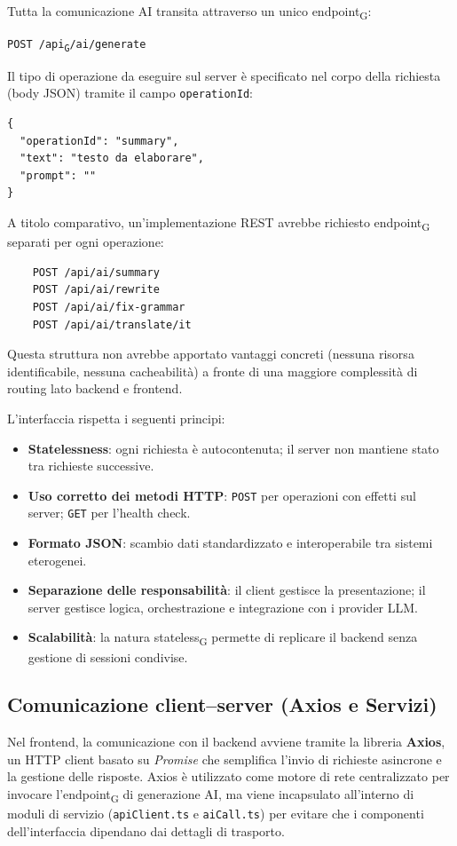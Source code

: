 \documentclass[11pt,a4paper]{article}
\newcommand{\gls}[1]{#1\textsubscript{G}}
\begin{document}
Tutta la comunicazione AI transita attraverso un unico \gls{endpoint}:
\begin{center}
    \texttt{POST /\gls{api}/ai/generate}
\end{center}
Il tipo di operazione da eseguire sul server è specificato nel corpo della richiesta (body JSON) tramite il campo \texttt{operationId}:
\begin{verbatim}
{
  "operationId": "summary",
  "text": "testo da elaborare",
  "prompt": "" 
}
\end{verbatim}

A titolo comparativo, un'implementazione REST avrebbe richiesto \gls{endpoint} separati per ogni operazione:
\begin{verbatim}
    POST /api/ai/summary
    POST /api/ai/rewrite
    POST /api/ai/fix-grammar
    POST /api/ai/translate/it
\end{verbatim}
Questa struttura non avrebbe apportato vantaggi concreti (nessuna risorsa identificabile, nessuna cacheabilità) a fronte di una maggiore complessità di routing lato backend e frontend.

L'interfaccia rispetta i seguenti principi:
\begin{itemize}
    \item \textbf{Statelessness}: ogni richiesta è autocontenuta; il server non mantiene stato tra richieste successive.
    \item \textbf{Uso corretto dei metodi HTTP}: \texttt{POST} per operazioni con effetti sul server; \texttt{GET} per l'health check.
    \item \textbf{Formato JSON}: scambio dati standardizzato e interoperabile tra sistemi eterogenei.
    \item \textbf{Separazione delle responsabilità}: il client gestisce la presentazione; il server gestisce logica, orchestrazione e integrazione con i provider LLM.
    \item \textbf{Scalabilità}: la natura \gls{stateless} permette di replicare il backend senza gestione di sessioni condivise.
\end{itemize}

\subsection{Comunicazione client–server (Axios e Servizi)}
Nel frontend, la comunicazione con il backend avviene tramite la libreria \textbf{Axios}, un HTTP client basato su \textit{Promise} che semplifica l'invio di richieste asincrone e la gestione delle risposte. Axios è utilizzato come motore di rete centralizzato per invocare l'\gls{endpoint} di generazione AI, ma viene incapsulato all'interno di moduli di servizio (\texttt{apiClient.ts} e \texttt{aiCall.ts}) per evitare che i componenti dell'interfaccia dipendano dai dettagli di trasporto.
\end{document}
